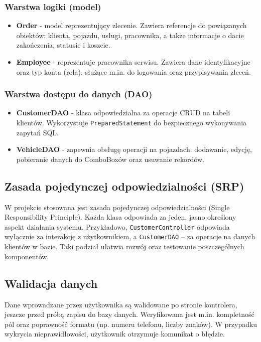 \subsubsection*{Warstwa logiki (model)}
\begin{itemize}
    \item \textbf{Order} - model reprezentujący zlecenie. Zawiera referencje do powiązanych obiektów: klienta, pojazdu, usługi, pracownika, a także informacje o dacie zakończenia, statusie i koszcie.
    
    \item \textbf{Employee} - reprezentuje pracownika serwisu. Zawiera dane identyfikacyjne oraz typ konta (rola), służące m.in. do logowania oraz przypisywania zleceń.
\end{itemize}

\subsubsection*{Warstwa dostępu do danych (DAO)}
\begin{itemize}
    \item \textbf{CustomerDAO} - klasa odpowiedzialna za operacje CRUD na tabeli klientów. Wykorzystuje \texttt{PreparedStatement} do bezpiecznego wykonywania zapytań SQL.
    
    \item \textbf{VehicleDAO} - zapewnia obsługę operacji na pojazdach: dodawanie, edycję, pobieranie danych do ComboBoxów oraz usuwanie rekordów.
\end{itemize}

\subsection{Zasada pojedynczej odpowiedzialności (SRP)}

W projekcie stosowana jest zasada pojedynczej odpowiedzialności (Single Responsibility Principle). Każda klasa odpowiada za jeden, jasno określony aspekt działania systemu. Przykładowo, \texttt{CustomerController} odpowiada wyłącznie za interakcję z użytkownikiem, a \texttt{CustomerDAO} – za operacje na danych klientów w bazie. Taki podział ułatwia rozwój oraz testowanie poszczególnych komponentów.

\subsection{Walidacja danych}

Dane wprowadzane przez użytkownika są walidowane po stronie kontrolera, jeszcze przed próbą zapisu do bazy danych. Weryfikowana jest m.in. kompletność pól oraz poprawność formatu (np. numeru telefonu, liczby znaków). W przypadku wykrycia nieprawidłowości, użytkownik otrzymuje komunikat o błędzie.

